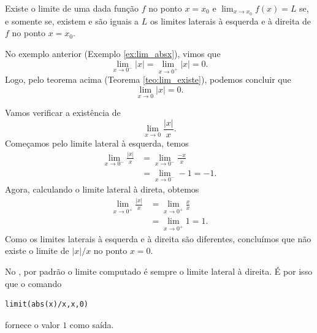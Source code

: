 \begin{teo}\label{teo:lim_existe}
  Existe o limite de uma dada função $f$ no ponto $x=x_0$ e $\lim_{x\to x_0} f(x) = L$ se, e somente se, existem e são iguais a $L$ os limites laterais à esquerda e à direita de $f$ no ponto $x=x_0$.
\end{teo}

\begin{exer}
  No exemplo anterior (Exemplo \ref{ex:lim_absx}), vimos que
  \begin{equation}
    \lim_{x\to 0^-} |x| = \lim_{x\to 0^+} |x| = 0.
  \end{equation}
  Logo, pelo teorema acima (Teorema \ref{teo:lim_existe}), podemos concluir que
  \begin{equation}
    \lim_{x\to 0} |x| = 0.
  \end{equation}
\end{exer}

\begin{exer}
  Vamos verificar a existência de
  \begin{equation}
    \lim_{x\to 0} \frac{|x|}{x}.
  \end{equation}
  Começamos pelo limite lateral à esquerda, temos
  \begin{align}
    \lim_{x\to 0^-} \frac{|x|}{x} &= \lim_{x\to 0^-} \frac{-x}{x}\\
    &= \lim_{x\to 0^-} -1 = -1.
  \end{align}
  Agora, calculando o limite lateral à direta, obtemos
  \begin{align}
    \lim_{x\to 0^+} \frac{|x|}{x} &= \lim_{x\to 0^+} \frac{x}{x}\\
    &= \lim_{x\to 0^+} 1 = 1.
  \end{align}
  Como os limites laterais à esquerda e à direita são diferentes, concluímos que não existe o limite de $|x|/x$ no ponto $x=0$.

  \ifispython
  No \sympy, por padrão o limite computado é sempre o limite lateral à direita. É por isso que o comando
\begin{verbatim}
limit(abs(x)/x,x,0)
\end{verbatim}
  fornece o valor $1$ como saída.
  \fi
\end{exer}

